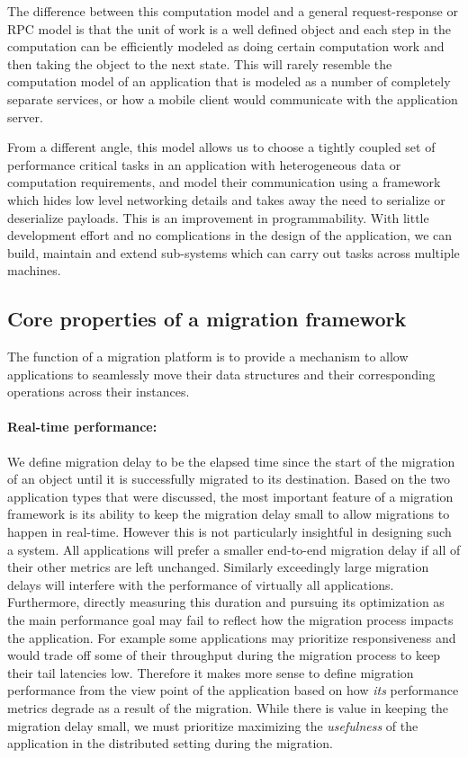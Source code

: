 The difference between this computation model and a general
request-response or RPC model is that the unit of work is a
well defined object and each step in the computation can be
efficiently modeled as doing certain computation work and then taking
the object to the next state. This will rarely resemble the computation
model of an application that is modeled as a number of completely separate
services, or how a mobile client would communicate with the application
server.

From a different angle, this model allows us to choose a tightly
coupled set of performance critical tasks in an application with
heterogeneous data or computation requirements, and model their
communication using a framework which hides low level networking details
and takes away the need to serialize or deserialize payloads.
This is an improvement in programmability. With little development
effort and no complications in the design of the application,
we can build, maintain and
extend sub-systems which can carry out tasks across multiple machines.

\subsection{Core properties of a migration framework}

The function of a migration platform is to provide a mechanism to allow
applications to seamlessly move their data structures and their
corresponding operations across their instances.

\paragraph{Real-time performance:}
We define migration delay to be the elapsed time since the start of the
migration of an object until it is successfully migrated to its
destination. Based on the two application types that were discussed,
the most
important feature of a migration framework is its ability to keep the
migration delay small to allow migrations to happen in real-time.
However this is not particularly insightful in designing such a system.
All applications will prefer a smaller end-to-end migration delay
if all of their other metrics are left unchanged. Similarly exceedingly
    large migration delays will interfere with the performance of
    virtually all applications. Furthermore, directly measuring this
    duration and pursuing its optimization as the main performance goal
    may fail to reflect how the migration process impacts the application.
    For example some applications may prioritize responsiveness and
    would trade off
    some of their throughput during the migration process to keep their
    tail latencies low.  Therefore it makes more sense to define migration
    performance from the view point of the application based on how
    \emph{its} performance metrics degrade as a result of the migration.
    While there is value in keeping the migration delay small, we must
    prioritize maximizing the \emph{usefulness} of the application in
    the distributed setting during the migration.


